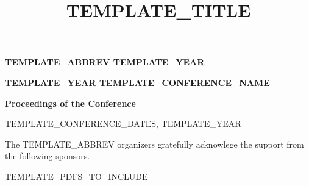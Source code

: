 \documentclass[10pt]{article}
\date{}
\title{TEMPLATE_TITLE}
\begin{document}
\begin{titlepage}
   \begin{center}
       \vspace*{1cm}

       \textbf{TEMPLATE_ABBREV TEMPLATE_YEAR}

       \vspace{4cm}

       \textbf{TEMPLATE_YEAR TEMPLATE_CONFERENCE_NAME}

       \vfill

       \textbf{Proceedings of the Conference}

       \vspace{5cm}


       TEMPLATE_CONFERENCE_DATES, TEMPLATE_YEAR

   \end{center}
\end{titlepage}

\setcounter{page}{2}
\newpage
The TEMPLATE_ABBREV organizers gratefully acknowlege the support from the following sponsors.



\newpage

\pagestyle{plain}
\tableofcontents

\newpage
{}
\setcounter{page}{1}

TEMPLATE_PDFS_TO_INCLUDE
\end{document}

